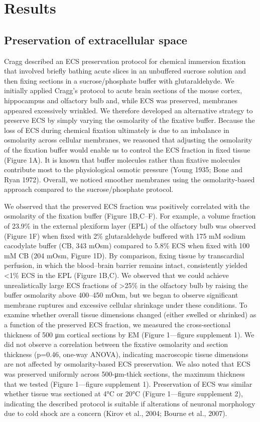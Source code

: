 \documentclass{article}
\begin{document}
\section*{Results}

\subsection*{Preservation of extracellular space}

Cragg described an ECS preservation protocol for chemical immersion fixation that involved briefly bathing acute slices in an unbuffered sucrose solution and then fixing sections in a sucrose/phosphate buffer with glutaraldehyde. We initially applied Cragg’s protocol to acute brain sections of the mouse cortex, hippocampus and olfactory bulb and, while ECS was preserved, membranes appeared excessively wrinkled. We therefore developed an alternative strategy to preserve ECS by simply varying the osmolarity of the fixative buffer. Because the loss of ECS during chemical fixation ultimately is due to an imbalance in osmolarity across cellular membranes, we reasoned that adjusting the osmolarity of the fixation buffer would enable us to control the ECS fraction in fixed tissue (Figure 1A). It is known that buffer molecules rather than fixative molecules contribute most to the physiological osmotic pressure (Young 1935; Bone and Ryan 1972). Overall, we noticed smoother membranes using the osmolarity-based approach compared to the sucrose/phosphate protocol.

We observed that the preserved ECS fraction was positively correlated with the osmolarity of the fixation buffer (Figure 1B,C–F). For example, a volume fraction of 23.9\% in the external plexiform layer (EPL) of the olfactory bulb was observed (Figure 1F) when fixed with 2\% glutaraldehyde buffered with 175 mM sodium cacodylate buffer (CB, 343 mOsm) compared to 5.8\% ECS when fixed with 100 mM CB (204 mOsm, Figure 1D). By comparison, fixing tissue by transcardial perfusion, in which the blood–brain barrier remains intact, consistently yielded <1\% ECS in the EPL (Figure 1B,C). We observed that we could achieve unrealistically large ECS fractions of >25\% in the olfactory bulb by raising the buffer osmolarity above 400–450 mOsm, but we began to observe significant membrane ruptures and excessive cellular shrinkage under these conditions. To examine whether overall tissue dimensions changed (either swelled or shrinked) as a function of the preserved ECS fraction, we measured the cross-sectional thickness of 500 μm cortical sections by EM (Figure 1—figure supplement 1). We did not observe a correlation between the fixative osmolarity and section thickness (p=0.46, one-way ANOVA), indicating macroscopic tissue dimensions are not affected by osmolarity-based ECS preservation. We also noted that ECS was preserved uniformly across 500-μm-thick sections, the maximum thickness that we tested (Figure 1—figure supplement 1). Preservation of ECS was similar whether tissue was sectioned at 4°C or 20°C (Figure 1—figure supplement 2), indicating the described protocol is suitable if alterations of neuronal morphology due to cold shock are a concern (Kirov et al., 2004; Bourne et al., 2007).
\end{document}
